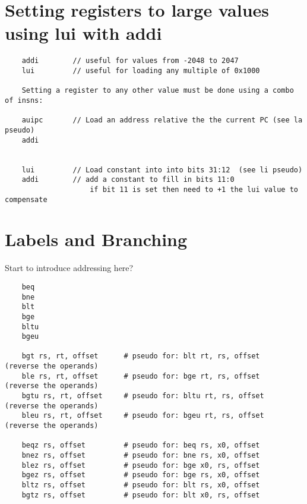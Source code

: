 \section{Setting registers to large values using lui with addi}

\label{uguide:lui}
\label{uguide:auipc}
\begin{verbatim}
    addi        // useful for values from -2048 to 2047
    lui         // useful for loading any multiple of 0x1000

    Setting a register to any other value must be done using a combo of insns:

    auipc       // Load an address relative the the current PC (see la pseudo)
    addi


    lui         // Load constant into into bits 31:12  (see li pseudo)
    addi        // add a constant to fill in bits 11:0
                    if bit 11 is set then need to +1 the lui value to compensate
\end{verbatim}


\section{Labels and Branching}

Start to introduce addressing here?

\label{uguide:beq}
\label{uguide:bne}
\label{uguide:blt}
\label{uguide:bge}
\label{uguide:bltu}
\label{uguide:bgeu}
\label{uguide:bgt}
\label{uguide:ble}
\label{uguide:bgtu}
\label{uguide:beqz}
\label{uguide:bnez}
\label{uguide:blez}
\label{uguide:bgez}
\label{uguide:bltz}
\label{uguide:bgtz}
\begin{verbatim}
    beq
    bne
    blt
    bge
    bltu
    bgeu

    bgt rs, rt, offset      # pseudo for: blt rt, rs, offset    (reverse the operands)
    ble rs, rt, offset      # pseudo for: bge rt, rs, offset    (reverse the operands)
    bgtu rs, rt, offset     # pseudo for: bltu rt, rs, offset   (reverse the operands)
    bleu rs, rt, offset     # pseudo for: bgeu rt, rs, offset   (reverse the operands)

    beqz rs, offset         # pseudo for: beq rs, x0, offset
    bnez rs, offset         # pseudo for: bne rs, x0, offset
    blez rs, offset         # pseudo for: bge x0, rs, offset
    bgez rs, offset         # pseudo for: bge rs, x0, offset
    bltz rs, offset         # pseudo for: blt rs, x0, offset
    bgtz rs, offset         # pseudo for: blt x0, rs, offset
\end{verbatim}


